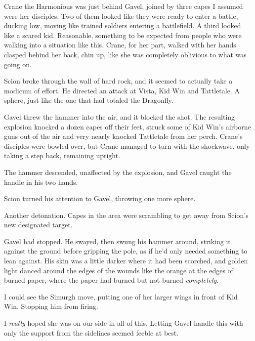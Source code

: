 Crane the Harmonious was just behind Gavel, joined by three capes I assumed were her disciples.  Two of them looked like they were ready to enter a battle, ducking low, moving like trained soldiers entering a battlefield.  A third looked like a scared kid.  Reasonable, something to be expected from people who were walking into a situation like this.  Crane, for her part, walked with her hands clasped behind her back, chin up, like she was completely oblivious to what was going on.



Scion broke through the wall of hard rock, and it seemed to actually take a modicum of effort.  He directed an attack at Vista, Kid Win and Tattletale.  A sphere, just like the one that had totaled the Dragonfly.



Gavel threw the hammer into the air, and it blocked the shot.  The resulting explosion knocked a dozen capes off their feet, struck some of Kid Win's airborne guns out of the air and very nearly knocked Tattletale from her perch.  Crane's disciples were bowled over, but Crane managed to turn with the shockwave, only taking a step back, remaining upright.



The hammer descended, unaffected by the explosion, and Gavel caught the handle in his two hands.



Scion turned his attention to Gavel, throwing one more sphere.



Another detonation.  Capes in the area were scrambling to get away from Scion's new designated target.



Gavel had stopped.  He swayed, then swung his hammer around, striking it against the ground before gripping the pole, as if he'd only needed something to lean against.  His skin was a little darker where it had been scorched, and golden light danced around the edges of the wounds like the orange at the edges of burned paper, where the paper had burned but not burned \emph{completely}.



I could see the Simurgh move, putting one of her larger wings in front of Kid Win.  Stopping him from firing.



I \emph{really} hoped she was on our side in all of this.  Letting Gavel handle this with only the support from the sidelines seemed feeble at best.



